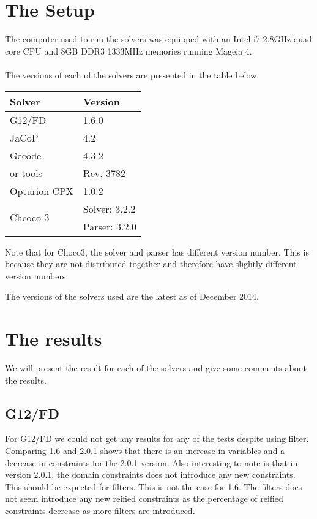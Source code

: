 \section{The Setup}
The computer used to run the solvers was equipped with an Intel i7 2.8GHz quad core CPU and 8GB DDR3 1333MHz memories running Mageia 4.
\\\\
The versions of each of the solvers are presented in the table below.
\begin{table}[h]
\begin{tabular}{l|l}
Solver                    & Version \\ \hline
G12/FD                    & 1.6.0\\
JaCoP                     & 4.2 \\
Gecode                    & 4.3.2 \\
or-tools                  & Rev. 3782 \\
Opturion CPX              & 1.0.2 \\
\multirow{2}{*}{Chcoco 3} & Solver: 3.2.2 \\
                          & Parser: 3.2.0
\end{tabular}
\end{table}
Note that for Choco3, the solver and parser has different version number. This is because they are not distributed together and therefore have slightly different version numbers.

The versions of the solvers used are the latest as of December 2014.

\section{The results}\label{sec:res}
We will present the result for each of the solvers and give some comments about the results.


\subsection{G12/FD}


For G12/FD we could not get any results for any of the tests despite using filter. Comparing 1.6 and 2.0.1 shows that there is an increase in variables and a decrease in constraints for the 2.0.1 version. Also interesting to note is that in version 2.0.1, the domain constraints does not introduce any new constraints. This should be expected for filters. This is not the case for 1.6. The filters does not seem introduce any new reified constraints as the percentage of reified constraints decrease as more filters are introduced.

